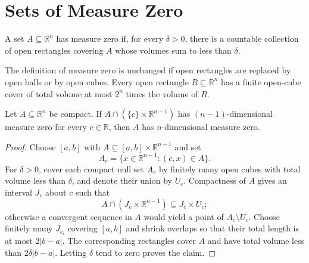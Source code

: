 

\section{Sets of Measure Zero}

\begin{definition}
\label{def:6-38-extra-1}
\mathlibok
A set $A \subseteq \mathbb{R}^n$ has measure zero if, for every $\delta>0$, there is a countable collection of open rectangles covering $A$ whose volumes sum to less than $\delta$.
\end{definition}

\begin{lemma}
\label{exer:6-1}
\leanok
{}
The definition of measure zero is unchanged if open rectangles are replaced
by open balls or by open cubes. Every open rectangle
$R\subseteq\mathbb R^n$ has a finite open-cube cover of total volume at most
$2^n$ times the volume of $R$.
\end{lemma}

\begin{lemma}
\label{lem:6-2}
\leanok
{}
Let $A \subseteq \mathbb{R}^n$ be compact. If
$A \cap (\{c\}\times\mathbb{R}^{n-1})$ has $(n-1)$-dimensional measure zero for every $c\in\mathbb{R}$, then $A$ has $n$-dimensional measure zero.
\end{lemma}

\begin{proof}
\leanok
\sketch Choose $[a,b]$ with $A\subseteq [a,b]\times\mathbb{R}^{n-1}$ and set
\[
A_c=\{x\in\mathbb{R}^{n-1}:(c,x)\in A\}.
\]
For $\delta>0$, cover each compact null set $A_c$ by finitely many open cubes with total volume less than $\delta$, and denote their union by $U_c$. Compactness of $A$ gives an interval $J_c$ about $c$ such that
\[
A\cap(J_c\times\mathbb{R}^{n-1})\subseteq J_c\times U_c;
\]
otherwise a convergent sequence in $A$ would yield a point of $A_c\setminus U_c$. Choose finitely many $J_{c_i}$ covering $[a,b]$ and shrink overlaps so that their total length is at most $2|b-a|$. The corresponding rectangles cover $A$ and have total volume less than $2\delta|b-a|$. Letting $\delta$ tend to zero proves the claim.
\end{proof}

